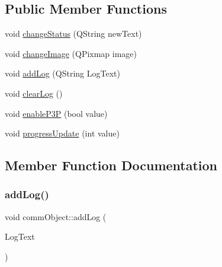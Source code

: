 \subsection*{Public Member Functions}
\begin{DoxyCompactItemize}
\item 
void \hyperlink{classcomm_object_a1f4b8dd22ecc46bab619f6b1fe1a5144}{change\+Status} (Q\+String new\+Text)
\item 
void \hyperlink{classcomm_object_a6f81522c2aa1668fa402f08710e6206b}{change\+Image} (Q\+Pixmap image)
\item 
void \hyperlink{classcomm_object_aec354c7099b3039083cc4224e071e022}{add\+Log} (Q\+String Log\+Text)
\item 
void \hyperlink{classcomm_object_a785f776d16f1871786bb88482fc4dd1f}{clear\+Log} ()
\item 
void \hyperlink{classcomm_object_a7552116eb5e18c49c6dcf943de29af7a}{enable\+P3P} (bool value)
\item 
void \hyperlink{classcomm_object_acfc97f4310e2b7d841ecb8cf8be0088e}{progress\+Update} (int value)
\end{DoxyCompactItemize}


\subsection{Member Function Documentation}
\mbox{\label{classcomm_object_aec354c7099b3039083cc4224e071e022}} 
\subsubsection{\texorpdfstring{add\+Log()}{addLog()}}
{\footnotesize\ttfamily void comm\+Object\+::add\+Log (\begin{DoxyParamCaption}\item[{Q\+String}]{Log\+Text }\end{DoxyParamCaption})}

